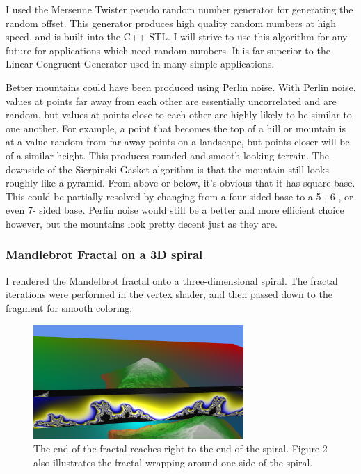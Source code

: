 \documentclass[journal]{IEEEtran}
\begin{document}
I used the Mersenne Twister pseudo random number generator for generating the random offset. This generator produces high quality random numbers at high speed, and is built into the C++ STL. I will strive to use this algorithm for any future for applications which need random numbers. It is far superior to the Linear Congruent Generator used in many simple applications.

Better mountains could have been produced using Perlin noise. With Perlin noise, values at points far away from each other are essentially uncorrelated and are random, but values at points close to each other are highly likely to be similar to one another. For example, a point that becomes the top of a hill or mountain is at a value random from far-away points on a landscape, but points closer will be of a similar height. This produces rounded and smooth-looking terrain. The downside of the Sierpinski Gasket algorithm is that the mountain still looks roughly like a pyramid. From above or below, it's obvious that it has square base. This could be partially resolved by changing from a four-sided base to a 5-, 6-, or even 7- sided base. Perlin noise would still be a better and more efficient choice however, but the mountains look pretty decent just as they are.

\subsubsection{Mandlebrot Fractal on a 3D spiral}

I rendered the Mandelbrot fractal onto a three-dimensional spiral. The fractal iterations were performed in the vertex shader, and then passed down to the fragment for smooth coloring.

\begin{figure}[htbp]
\centering
\fbox
{
	\begin{minipage}{8 cm}
		\includegraphics[width=80mm]{resources/screenshot3.png}
		\caption{The end of the fractal reaches right to the end of the spiral. Figure 2 also illustrates the fractal wrapping around one side of the spiral.}
	\end{minipage}
}
\end{figure}
\end{document}
